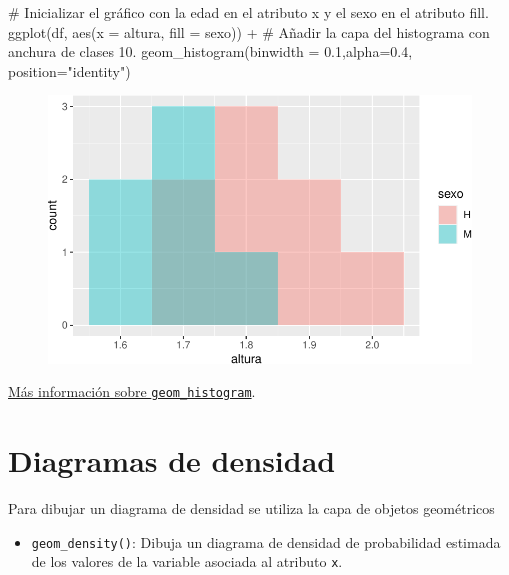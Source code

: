 \documentclass[
  a4paper,
]{scrreport}
\newenvironment{Shaded}{\begin{snugshade}}{\end{snugshade}}
\newcommand{\AttributeTok}[1]{\textcolor[rgb]{0.40,0.45,0.13}{#1}}
\newcommand{\CommentTok}[1]{\textcolor[rgb]{0.37,0.37,0.37}{#1}}
\newcommand{\FloatTok}[1]{\textcolor[rgb]{0.68,0.00,0.00}{#1}}
\newcommand{\FunctionTok}[1]{\textcolor[rgb]{0.28,0.35,0.67}{#1}}
\newcommand{\NormalTok}[1]{\textcolor[rgb]{0.00,0.23,0.31}{#1}}
\newcommand{\SpecialCharTok}[1]{\textcolor[rgb]{0.37,0.37,0.37}{#1}}
\newcommand{\StringTok}[1]{\textcolor[rgb]{0.13,0.47,0.30}{#1}}
\providecommand{\tightlist}{%
  \setlength{\itemsep}{0pt}\setlength{\parskip}{0pt}}\usepackage{longtable,booktabs,array}
\theoremstyle{definition}
\theoremstyle{definition}
\theoremstyle{remark}
\begin{document}
\begin{Shaded}
\begin{Highlighting}[]
\CommentTok{\# Inicializar el gráfico con la edad en el atributo x y el sexo en el atributo fill.}
\FunctionTok{ggplot}\NormalTok{(df, }\FunctionTok{aes}\NormalTok{(}\AttributeTok{x =}\NormalTok{ altura, }\AttributeTok{fill =}\NormalTok{ sexo)) }\SpecialCharTok{+}
\CommentTok{\# Añadir la capa del histograma con anchura de clases 10.}
    \FunctionTok{geom\_histogram}\NormalTok{(}\AttributeTok{binwidth =} \FloatTok{0.1}\NormalTok{,}\AttributeTok{alpha=}\FloatTok{0.4}\NormalTok{, }\AttributeTok{position=}\StringTok{"identity"}\NormalTok{)}
\end{Highlighting}
\end{Shaded}

\begin{figure}[H]

{\centering \includegraphics{./07-graficos_files/figure-pdf/unnamed-chunk-18-1.pdf}

}

\end{figure}

\href{https://ggplot2.tidyverse.org/reference/geom_histogram.html}{Más
información sobre \texttt{geom\_histogram}}.

\hypertarget{diagramas-de-densidad}{%
\section{Diagramas de densidad}\label{diagramas-de-densidad}}

Para dibujar un diagrama de densidad se utiliza la capa de objetos
geométricos

\begin{itemize}
\tightlist
\item
  \texttt{geom\_density()}: Dibuja un diagrama de densidad de
  probabilidad estimada de los valores de la variable asociada al
  atributo \texttt{x}.
\end{itemize}
\end{document}

